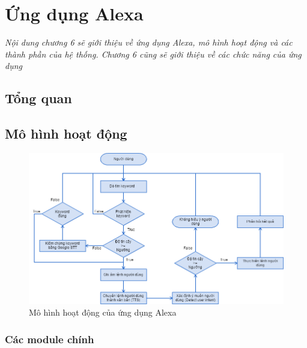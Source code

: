 \chapter{Ứng dụng Alexa}
\ifpdf
    \graphicspath{{Chapter6/Chapter6Figs/PNG/}{Chapter6/Chapter6Figs/PDF/}{Chapter6/Chapter6Figs/}}
\else
    \graphicspath{{Chapter6/Chapter6Figs/EPS/}{Chapter6/Chapter6Figs/}}
\fi

\textit{Nội dung chương 6 sẽ giới thiệu về ứng dụng Alexa, mô hình hoạt động và các thành phần của hệ thống. Chương 6 cũng sẽ giới thiệu về các chức năng của ứng dụng}

\section{Tổng quan}

\section{Mô hình hoạt động}
\begin{figure}[h!]
    \centering
    \includegraphics[scale=0.5]{system_flowchart}
    \caption{Mô hình hoạt động của ứng dụng Alexa}
    \label{fig:c6_system_flowchart}
\end{figure}

\subsection{Các module chính}
